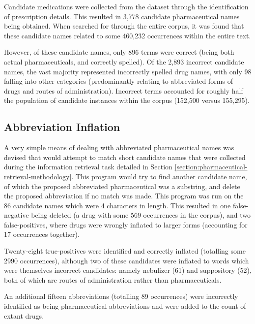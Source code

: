 
Candidate medications were collected from the dataset through the identification of prescription details. This resulted in 3,778 candidate pharmaceutical names being obtained. When searched for through the entire corpus, it was found that these candidate names related to some 460,232 occurrences within the entire text.  

However, of these candidate names, only 896 terms were correct (being both actual pharmaceuticals, and correctly spelled). Of the 2,893 incorrect candidate names, the vast majority represented incorrectly spelled drug names, with only 98 falling into other categories (predominantly relating to abbreviated forms of drugs and routes of administration). Incorrect terms accounted for roughly half the population of candidate instances within the corpus (152,500 versus 155,295).


\subsection{Abbreviation Inflation}

A very simple means of dealing with abbreviated pharmaceutical names was devised that would attempt to match short candidate names that were collected during the information retrieval task detailed in Section \ref{section:pharmaceutical-retrieval-methodology}. This program would try to find another candidate name, of which the proposed abbreviated pharmaceutical was a substring, and delete the proposed abbreviation if no match was made. This program was run on the 86 candidate names which were 4 characters in length. This resulted in one false-negative being deleted (a drug with some 569 occurrences in the corpus), and two false-positives, where drugs were wrongly inflated to larger forms (accounting for 17 occurrences together). 

Twenty-eight true-positives were identified and correctly inflated (totalling some 2990 occurrences), although two of these candidates were inflated to words which were themselves incorrect candidates: namely nebulizer (61) and suppository (52), both of which are routes of administration rather than pharmaceuticals.

An additional fifteen abbreviations (totalling 89 occurrences) were incorrectly identified as being pharmaceutical abbreviations and were added to the count of extant drugs.

